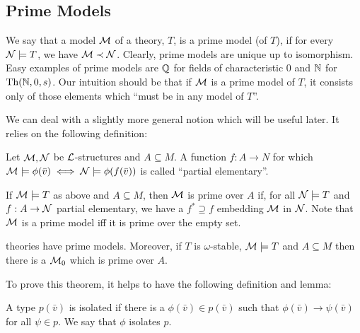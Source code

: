 \subsection{Prime Models}

\begin{definition}\label{definition_prime_model}
We say that a model \(\mathcal{M}\) of a theory, \(T\), is a prime model (of \(T\)), if for every \(\mathcal{N} \models T\), we have \(\mathcal{M} \prec \mathcal{N}\). 
Clearly, prime models are unique up to isomorphism. 
Easy examples of prime models are \(\mathbb{Q}\) for fields of characteristic 0 and \(\mathbb{N}\) for \(\text{Th}(\mathbb{N}, 0, s)\). 
Our intuition should be that if \(\mathcal{M}\) is a prime model of \(T\), it consists only of those elements which ``must be in any model of \(T\)''.
\end{definition}

We can deal with a slightly more general notion which will be useful later. 
It relies on the following definition:

\begin{definition}\label{definition_partial_elementary}
Let \(\mathcal{M}, \mathcal{N}\) be \(\mathcal{L}\)-structures and \(A \subseteq M\).
A function \(f:A \to N\) for which \(\mathcal{M} \models \phi(\bar{v}) \iff \mathcal{N} \models \phi(f(\bar{v}))\) is called ``partial elementary''.
\end{definition}

\begin{definition}\label{definition_prime_over}
If \(\mathcal{M} \models T\) as above and \(A \subseteq M\), then \(\mathcal{M}\) is prime over \(A\) if, for all \(\mathcal{N} \models T\) and \(f:A \to \mathcal{N}\) partial elementary, we have a \(f^* \supseteq f\) embedding \(\mathcal{M}\) in \(\mathcal{N}\). 
Note that \(\mathcal{M}\) is a prime model iff it is prime over the empty set.
\end{definition}

\begin{theorem}\label{thm_omst_prime}
\omst theories have prime models. Moreover, if \(T\) is \(\omega\)-stable, \(\mathcal{M} \models T\) and \(A \subseteq M\) then there is a \(\mathcal{M}_0\) which is prime over \(A\). 
\end{theorem}

\noindent To prove this theorem, it helps to have the following definition and lemma:
\begin{definition}\label{definition_isolated_types}
A type \(p(\bar{v})\) is isolated if there is a \(\phi(\bar{v}) \in p(\bar{v})\) such that \(\phi(\bar{v}) \to \psi(\bar{v})\) for all \(\psi \in p\). We say that \(\phi\) isolates \(p\).
\end{definition}

